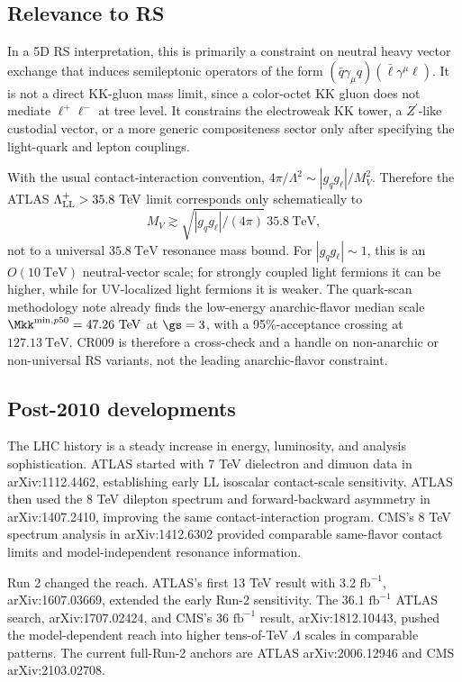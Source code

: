 \subsection*{Relevance to RS}
In a 5D RS interpretation, this is primarily a constraint on neutral heavy
vector exchange that induces semileptonic operators of the form
\((\bar q\gamma_\mu q)(\bar\ell\gamma^\mu\ell)\).  It is not a direct
KK-gluon mass limit, since a color-octet KK gluon does not mediate
\(\ell^+\ell^-\) at tree level.  It constrains the electroweak KK tower, a
\(Z^\prime\)-like custodial vector, or a more generic compositeness sector
only after specifying the light-quark and lepton couplings.

With the usual contact-interaction convention,
\(4\pi/\Lambda^2 \sim |g_q g_\ell|/M_V^2\).  Therefore the ATLAS
\(\Lambda_{\rm LL}^{+}>35.8~\mathrm{TeV}\) limit corresponds only
schematically to
\[
  M_V \gtrsim \sqrt{|g_q g_\ell|/(4\pi)}\,35.8~\mathrm{TeV},
\]
not to a universal \(35.8~\mathrm{TeV}\) resonance mass bound.  For
\(|g_q g_\ell|\sim 1\), this is an \(O(10~\mathrm{TeV})\) neutral-vector
scale; for strongly coupled light fermions it can be higher, while for
UV-localized light fermions it is weaker.  The quark-scan methodology note
already finds the low-energy anarchic-flavor median scale
\(\Mkk^{\min,p50}=47.26~\mathrm{TeV}\) at \(\gs=3\), with a
95\%-acceptance crossing at \(127.13~\mathrm{TeV}\).  CR009 is therefore a
cross-check and a handle on non-anarchic or non-universal RS variants, not the
leading anarchic-flavor constraint.

\subsection*{Post-2010 developments}
The LHC history is a steady increase in energy, luminosity, and analysis
sophistication.  ATLAS started with 7 TeV dielectron and dimuon data in
arXiv:1112.4462, establishing early LL isoscalar contact-scale sensitivity.
ATLAS then used the 8 TeV dilepton spectrum and forward-backward asymmetry in
arXiv:1407.2410, improving the same contact-interaction program.  CMS's 8 TeV
spectrum analysis in arXiv:1412.6302 provided comparable same-flavor contact
limits and model-independent resonance information.

Run 2 changed the reach.  ATLAS's first 13 TeV result with 3.2
\(\mathrm{fb}^{-1}\), arXiv:1607.03669, extended the early Run-2
sensitivity.  The 36.1 \(\mathrm{fb}^{-1}\) ATLAS search,
arXiv:1707.02424, and CMS's 36 \(\mathrm{fb}^{-1}\) result,
arXiv:1812.10443, pushed the model-dependent reach into higher
tens-of-TeV \(\Lambda\) scales in comparable patterns.  The current
full-Run-2 anchors are ATLAS arXiv:2006.12946 and CMS arXiv:2103.02708.

